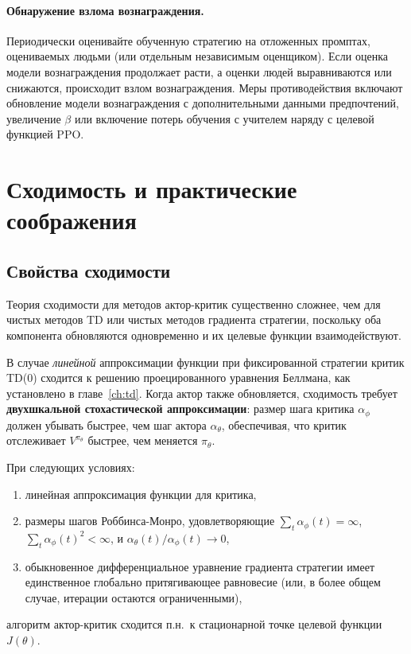 \paragraph{Обнаружение взлома вознаграждения.}
Периодически оценивайте обученную стратегию на отложенных промптах, оцениваемых людьми (или отдельным независимым оценщиком). Если оценка модели вознаграждения продолжает расти, а оценки людей выравниваются или снижаются, происходит взлом вознаграждения. Меры противодействия включают обновление модели вознаграждения с дополнительными данными предпочтений, увеличение $\beta$ или включение потерь обучения с учителем наряду с целевой функцией PPO.

\section{Сходимость и практические соображения}
\label{sec:ac-convergence}

\subsection{Свойства сходимости}

Теория сходимости для методов актор-критик существенно сложнее, чем для чистых методов TD или чистых методов градиента стратегии, поскольку оба компонента обновляются одновременно и их целевые функции взаимодействуют.

В случае \emph{линейной} аппроксимации функции при фиксированной стратегии критик TD(0) сходится к решению проецированного уравнения Беллмана, как установлено в главе~\ref{ch:td}. Когда актор также обновляется, сходимость требует \textbf{двухшкальной стохастической аппроксимации}: размер шага критика $\alpha_\phi$ должен убывать быстрее, чем шаг актора $\alpha_\theta$, обеспечивая, что критик отслеживает $V^{\pi_\theta}$ быстрее, чем меняется $\pi_\theta$.

\begin{theorem}
\label{thm:two-timescale}
При следующих условиях:
\begin{enumerate}[label=(\roman*), leftmargin=*]
  \item линейная аппроксимация функции для критика,
  \item размеры шагов Роббинса-Монро, удовлетворяющие $\sum_t \alpha_\phi(t) = \infty$, $\sum_t \alpha_\phi(t)^2 < \infty$, и $\alpha_\theta(t) / \alpha_\phi(t) \to 0$,
  \item обыкновенное дифференциальное уравнение градиента стратегии имеет единственное глобально притягивающее равновесие (или, в более общем случае, итерации остаются ограниченными),
\end{enumerate}
алгоритм актор-критик сходится п.н.\ к стационарной точке целевой функции $J(\theta)$.
\end{theorem}


